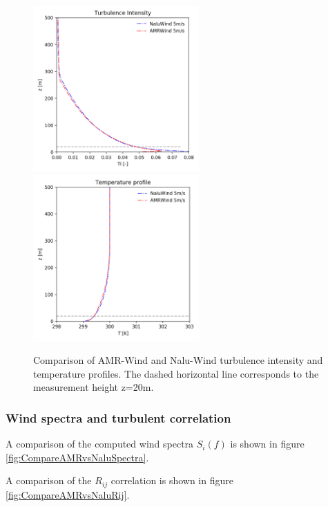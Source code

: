 \begin{figure} %
  \centering
  \includegraphics[width=2.5in]{figures/Compare_AMRWind_NaluWind/AMRWind_NaluWind_stable_05ms_mesh2p5_2p5_2p5_TI.png}
  \includegraphics[width=2.5in]{figures/Compare_AMRWind_NaluWind/AMRWind_NaluWind_stable_05ms_mesh2p5_2p5_2p5_T.png}
  \caption{\label{fig:CompareAMRvsNaluWind_TTI} Comparison of AMR-Wind
    and Nalu-Wind turbulence intensity and temperature profiles. The
    dashed horizontal line corresponds to the measurement height
    z=20m.}
\end{figure}

\subsubsection*{Wind spectra and turbulent correlation}

A comparison of the computed wind spectra $S_i(f)$ is shown in figure
\ref{fig:CompareAMRvsNaluSpectra}.

A comparison of the $R_{ij}$ correlation is shown in figure
\ref{fig:CompareAMRvsNaluRij}.

